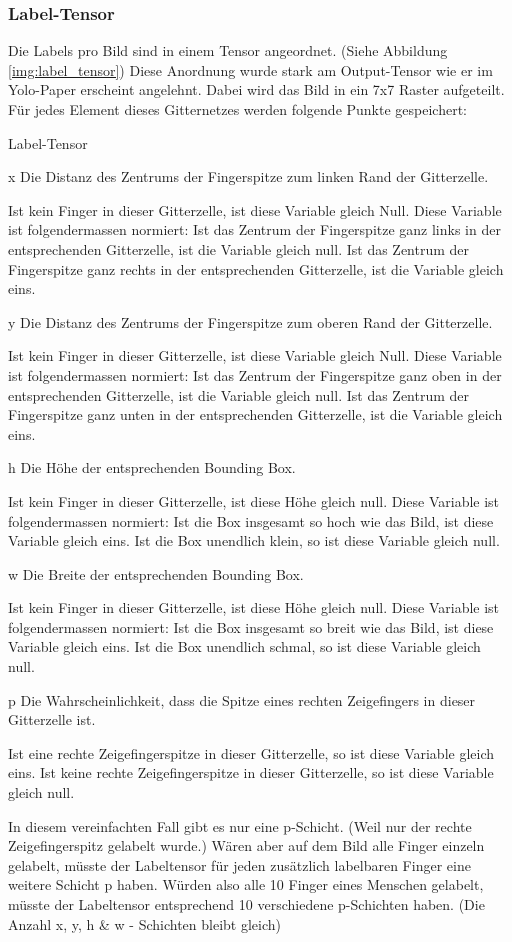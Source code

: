 \subsubsection{Label-Tensor}
\label{chapter:label_tensor}
Die Labels pro Bild sind in einem Tensor angeordnet. 
(Siehe Abbildung \ref{img:label_tensor})
Diese Anordnung wurde stark am Output-Tensor wie er im Yolo-Paper \cite{yolo} erscheint angelehnt.
Dabei wird das Bild in ein 7x7 Raster aufgeteilt.
Für jedes Element dieses Gitternetzes werden folgende Punkte gespeichert:
\begin{labeling}{Label-Tensor}
\item[x] Die Distanz des Zentrums der Fingerspitze zum linken Rand der Gitterzelle.

Ist kein Finger in dieser Gitterzelle, ist diese Variable gleich Null.
Diese Variable ist folgendermassen normiert: 
Ist das Zentrum der Fingerspitze ganz links in der entsprechenden Gitterzelle, ist die Variable gleich null.
Ist das Zentrum der Fingerspitze ganz rechts in der entsprechenden Gitterzelle, ist die Variable gleich eins.
\item[y] Die Distanz des Zentrums der Fingerspitze zum oberen Rand der Gitterzelle.

Ist kein Finger in dieser Gitterzelle, ist diese Variable gleich Null. 
Diese Variable ist folgendermassen normiert:
Ist das Zentrum der Fingerspitze ganz oben in der entsprechenden Gitterzelle, ist die Variable gleich null.
Ist das Zentrum der Fingerspitze ganz unten in der entsprechenden Gitterzelle, ist die Variable gleich eins.
\item[h] Die Höhe der entsprechenden Bounding Box.

Ist kein Finger in dieser Gitterzelle, ist diese Höhe gleich null.
Diese Variable ist folgendermassen normiert:
Ist die Box insgesamt so hoch wie das Bild, ist diese Variable gleich eins. 
Ist die Box \grqq{}unendlich\grqq{} klein, so ist diese Variable gleich null.
\item[w] Die Breite der entsprechenden Bounding Box.

Ist kein Finger in dieser Gitterzelle, ist diese Höhe gleich null.
Diese Variable ist folgendermassen normiert:
Ist die Box insgesamt so breit wie das Bild, ist diese Variable gleich eins.
Ist die Box \grqq{}unendlich\grqq{} schmal, so ist diese Variable gleich null.
\item[p] Die Wahrscheinlichkeit, dass die Spitze eines rechten Zeigefingers in dieser Gitterzelle ist. 

Ist eine rechte Zeigefingerspitze in dieser Gitterzelle, so ist diese Variable gleich eins.
Ist keine rechte Zeigefingerspitze in dieser Gitterzelle, so ist diese Variable gleich null.

In diesem vereinfachten Fall gibt es nur eine p-Schicht.
(Weil nur der rechte Zeigefingerspitz gelabelt wurde.)
Wären aber auf dem Bild alle Finger einzeln gelabelt, müsste der Labeltensor für jeden zusätzlich labelbaren Finger eine weitere Schicht p haben. 
Würden also alle 10 Finger eines Menschen gelabelt, müsste der Labeltensor entsprechend 10 verschiedene p-Schichten haben.
(Die Anzahl x, y, h \& w - Schichten bleibt gleich) 
\end{labeling}

